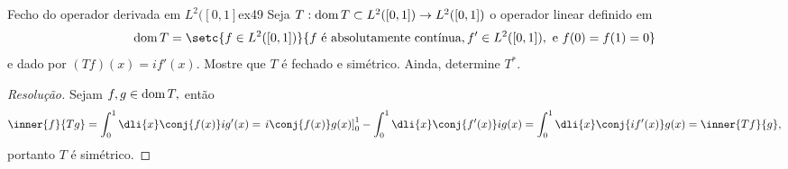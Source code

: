\begin{exercício}{Fecho do operador derivada em \(L^2([0,1]\)}{ex49}
  Seja \(T : \operatorname{dom}{T} \subset L^2([0,1]) \to L^2([0,1])\) o operador linear definido em
  \begin{equation*}
    \dom{T} = \setc{f \in L^2([0,1])}{f \text{ é absolutamente contínua}, f' \in L^2([0,1]),\text{ e }f(0) = f(1) = 0}
  \end{equation*}
  e dado por \((Tf)(x) = if'(x).\) Mostre que \(T\) é fechado e simétrico. Ainda, determine \(T^*.\)
\end{exercício}
\begin{proof}[Resolução]
  Sejam \(f, g \in \operatorname{dom}{T},\) então
  \begin{equation*}
    \inner{f}{Tg} = \int_0^1 \dli{x} \conj{f(x)} ig'(x) = \left.i\conj{f(x)}g(x)\right]_0^1 - \int_0^1\dli{x} \conj{f'(x)} i g(x) = \int_0^1 \dli{x} \conj{i f'(x)} g(x) = \inner{Tf}{g},
  \end{equation*}
  portanto \(T\) é simétrico.


\end{proof}
